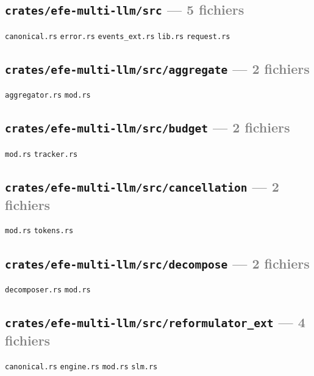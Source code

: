 \documentclass[10pt]{report}
\newcommand{\code}[1]{\texttt{\small #1}}
\begin{document}
\subsection*{\code{crates/efe-multi-llm/src} \normalfont\textcolor{grey}{--- 5 fichiers}}
\begin{sloppypar}\footnotesize\raggedright
\code{canonical.rs} \;\textbullet\; \code{error.rs} \;\textbullet\; \code{events\_ext.rs} \;\textbullet\; \code{lib.rs} \;\textbullet\; \code{request.rs}
\end{sloppypar}

\subsection*{\code{crates/efe-multi-llm/src/aggregate} \normalfont\textcolor{grey}{--- 2 fichiers}}
\begin{sloppypar}\footnotesize\raggedright
\code{aggregator.rs} \;\textbullet\; \code{mod.rs}
\end{sloppypar}

\subsection*{\code{crates/efe-multi-llm/src/budget} \normalfont\textcolor{grey}{--- 2 fichiers}}
\begin{sloppypar}\footnotesize\raggedright
\code{mod.rs} \;\textbullet\; \code{tracker.rs}
\end{sloppypar}

\subsection*{\code{crates/efe-multi-llm/src/cancellation} \normalfont\textcolor{grey}{--- 2 fichiers}}
\begin{sloppypar}\footnotesize\raggedright
\code{mod.rs} \;\textbullet\; \code{tokens.rs}
\end{sloppypar}

\subsection*{\code{crates/efe-multi-llm/src/decompose} \normalfont\textcolor{grey}{--- 2 fichiers}}
\begin{sloppypar}\footnotesize\raggedright
\code{decomposer.rs} \;\textbullet\; \code{mod.rs}
\end{sloppypar}

\subsection*{\code{crates/efe-multi-llm/src/reformulator\_ext} \normalfont\textcolor{grey}{--- 4 fichiers}}
\begin{sloppypar}\footnotesize\raggedright
\code{canonical.rs} \;\textbullet\; \code{engine.rs} \;\textbullet\; \code{mod.rs} \;\textbullet\; \code{slm.rs}
\end{sloppypar}
\end{document}
